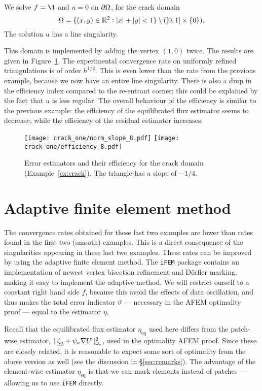 \documentclass[thesis.tex]{subfiles}
\begin{document}
\begin{exmp}
  \label{ex:crack}
  We solve $f = \1$ and $u = 0$ on $\partial \Omega$, for the crack domain
  \[
  \Omega=\{(x,y) \in \mathbb{R}^2 : |x|+|y|<1\}\setminus ([0,1] \times \set{0}).
  \]
The solution $u$ has a line singularity.
\end{exmp}
This domain is implemented by adding the vertex $(1,0)$ twice.  
The results are given in Figure~\ref{fig:crackone}.
The experimental convergence rate on uniformly refined triangulations is of order $h^{1/2}$. This is even lower than the
rate from the previous example, because we now have an entire line singularity.
There is also a drop in the efficiency index compared to the re-entrant corner; this could
be explained by the fact that $u$ is less regular. The overall behaviour of the efficiency is similar
to the previous example: the efficiency of the equilibrated flux estimator seems to decrease, 
while the efficiency of the residual estimator increases.
\begin{figure}
  \centering
  \texttt{[image: crack\_one/norm\_slope\_8.pdf]}
  \texttt{[image: crack\_one/efficiency\_8.pdf]}
  \caption{Error estimators and their efficiency for the crack domain (Example~\ref{ex:crack}). The triangle has a slope of $-1/4$.}
  \label{fig:crackone}
\end{figure}

\section{Adaptive finite element method}
The convergence rates obtained for these last two examples are lower than rates found in the first
two (smooth) examples. This is a direct consequence of the singularities appearing in these last two examples.
These rates can be improved by using the adaptive finite element method. The \texttt{iFEM} package contains
an implementation of newest vertex bisection refinement and D\"orfler marking, making it easy
to implement the adaptive method. We will restrict ourself to a constant right hand side $f$, because this
avoid the effects of data oscillation, and thus makes the total error indicator $\vartheta$ --- necessary in the AFEM optimality proof  ---
equal to the estimator $\eta$. 

Recall that the equilibrated flux estimator $\eta_{\text{eq}}$ used here differs from the patch-wise estimator, 
$\| \underline{\zeta_a} + \psi_a \nabla U \|^2_{\omega_a}$, used in the optimality AFEM proof.
Since these are closely related, it is reasonable to expect some sort of optimality from the above version as well 
(see the discussion in \S\ref{sec:remarks}). The advantage of the element-wise estimator $\eta_{\text{eq}}$ is that
we can mark elements instead of patches --- allowing us to use \texttt{iFEM} directly. 
\end{document}
